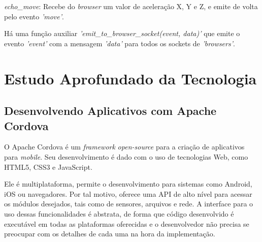 \documentclass[a4paper,12pt]{article}
\begin{document}
\emph{echo\_move}: Recebe do \emph{browser} um valor de aceleração X, Y e Z, e emite de volta pelo evento \emph{'move'}.

Há uma função auxiliar \emph{'emit\_to\_browser\_socket(event, data)'} que emite o evento \emph{'event'} com a mensagem \emph{'data'} para todos os sockets de \emph{'browsers'}.













%
%










\section{Estudo Aprofundado da Tecnologia}

\subsection{Desenvolvendo Aplicativos com Apache Cordova}



O Apache Cordova é um \emph{framework} \emph{open-source} para a criação de aplicativos para \emph{mobile}. Seu desenvolvimento é dado com o uso de tecnologias Web, como HTML5, CSS3 e JavaScript.

Ele é multiplataforma, permite o desenvolvimento para sistemas como Android, iOS ou navegadores. Por tal motivo, oferece uma API de alto nível para acessar os módulos desejados, tais como de sensores, arquivos e rede. A interface para o uso dessas funcionalidades é abstrata, de forma que código desenvolvido é executável em todas as plataformas oferecidas e o desenvolvedor não precisa se preocupar com os detalhes de cada uma na hora da implementação.
\end{document}
